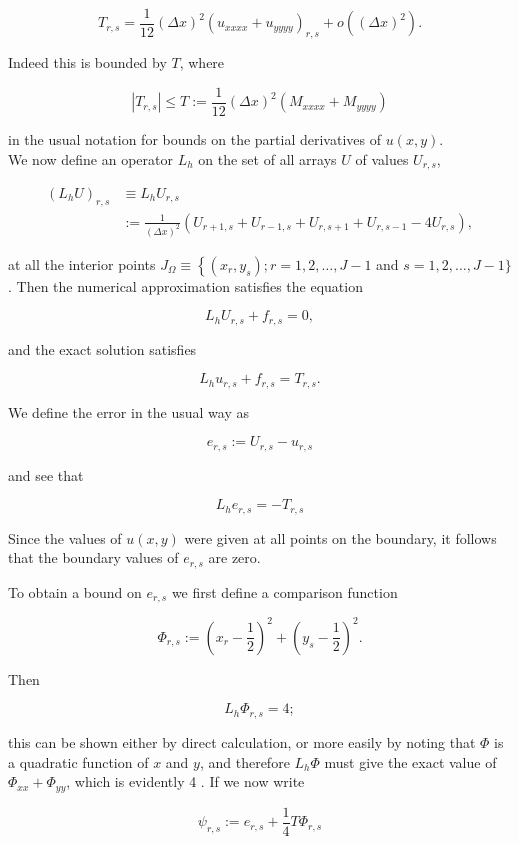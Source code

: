 \documentclass[10pt]{article}
\begin{document}
\[
T_{r, s}=\frac{1}{12}(\Delta x)^{2}\left(u_{x x x x}+u_{y y y y}\right)_{r, s}+o\left((\Delta x)^{2}\right) .
\]

Indeed this is bounded by \(T\), where

\[
\left|T_{r, s}\right| \leq T:=\frac{1}{12}(\Delta x)^{2}\left(M_{x x x x}+M_{y y y y}\right)
\]

in the usual notation for bounds on the partial derivatives of \(u(x, y)\).\\
We now define an operator \(L_{h}\) on the set of all arrays \(U\) of values \(U_{r, s}\),

\[
\begin{aligned}
\left(L_{h} U\right)_{r, s} & \equiv L_{h} U_{r, s} \\
& :=\frac{1}{(\Delta x)^{2}}\left(U_{r+1, s}+U_{r-1, s}+U_{r, s+1}+U_{r, s-1}-4 U_{r, s}\right),
\end{aligned}
\]

at all the interior points \(J_{\Omega} \equiv\left\{\left(x_{r}, y_{s}\right) ; r=1,2, \ldots, J-1\right.\) and \(s= 1,2, \ldots, J-1\}\). Then the numerical approximation satisfies the equation

\[
L_{h} U_{r, s}+f_{r, s}=0,
\]

and the exact solution satisfies

\[
L_{h} u_{r, s}+f_{r, s}=T_{r, s} .
\]

We define the error in the usual way as

\[
e_{r, s}:=U_{r, s}-u_{r, s}
\]

and see that

\[
L_{h} e_{r, s}=-T_{r, s}
\]

Since the values of \(u(x, y)\) were given at all points on the boundary, it follows that the boundary values of \(e_{r, s}\) are zero.

To obtain a bound on \(e_{r, s}\) we first define a comparison function

\[
\Phi_{r, s}:=\left(x_{r}-\frac{1}{2}\right)^{2}+\left(y_{s}-\frac{1}{2}\right)^{2} .
\]

Then

\[
L_{h} \Phi_{r, s}=4 ;
\]

this can be shown either by direct calculation, or more easily by noting that \(\Phi\) is a quadratic function of \(x\) and \(y\), and therefore \(L_{h} \Phi\) must give the exact value of \(\Phi_{x x}+\Phi_{y y}\), which is evidently 4 . If we now write

\[
\psi_{r, s}:=e_{r, s}+\frac{1}{4} T \Phi_{r, s}
\]
\end{document}
